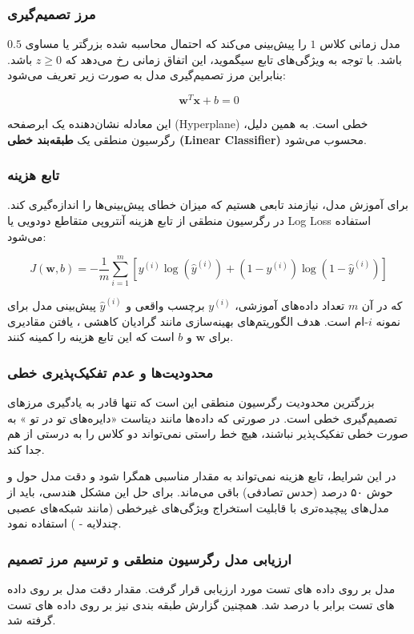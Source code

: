 \documentclass{article}
\begin{document}
\subsubsection{مرز تصمیم‌گیری }
مدل زمانی کلاس $1$ را پیش‌بینی می‌کند که احتمال محاسبه شده بزرگتر یا مساوی $0.5$ باشد. با توجه به ویژگی‌های تابع سیگموید، این اتفاق زمانی رخ می‌دهد که $z \ge 0$ باشد. بنابراین مرز تصمیم‌گیری مدل به صورت زیر تعریف می‌شود:

$$ \mathbf{w}^T \mathbf{x} + b = 0 $$

این معادله نشان‌دهنده یک ابرصفحه (Hyperplane) خطی است. به همین دلیل، رگرسیون منطقی یک \textbf{طبقه‌بند خطی (Linear Classifier)} محسوب می‌شود.

\subsubsection{تابع هزینه }
برای آموزش مدل، نیازمند تابعی هستیم که میزان خطای پیش‌بینی‌ها را اندازه‌گیری کند. در رگرسیون منطقی از تابع هزینه آنتروپی متقاطع دودویی  یا Log Loss استفاده می‌شود:

$$ J(\mathbf{w}, b) = -\frac{1}{m} \sum_{i=1}^{m} \left[ y^{(i)} \log(\hat{y}^{(i)}) + (1 - y^{(i)}) \log(1 - \hat{y}^{(i)}) \right] $$

که در آن $m$ تعداد داده‌های آموزشی، $y^{(i)}$ برچسب واقعی و $\hat{y}^{(i)}$ پیش‌بینی مدل برای نمونه $i$-ام است. هدف الگوریتم‌های بهینه‌سازی مانند گرادیان کاهشی ، یافتن مقادیری برای $\mathbf{w}$ و $b$ است که این تابع هزینه را کمینه کنند.

\subsubsection{محدودیت‌ها و عدم تفکیک‌پذیری خطی}
بزرگترین محدودیت رگرسیون منطقی این است که تنها قادر به یادگیری مرزهای تصمیم‌گیری خطی است. در صورتی که داده‌ها مانند دیتاست «دایره‌های تو در تو » به صورت خطی تفکیک‌پذیر  نباشند، هیچ خط راستی نمی‌تواند دو کلاس را به درستی از هم جدا کند. 

در این شرایط، تابع هزینه نمی‌تواند به مقدار مناسبی همگرا شود و دقت مدل حول و حوش ۵۰ درصد (حدس تصادفی) باقی می‌ماند. برای حل این مشکل هندسی، باید از مدل‌های پیچیده‌تری با قابلیت استخراج ویژگی‌های غیرخطی (مانند شبکه‌های عصبی چندلایه - ) استفاده نمود.

\subsubsection{ارزیابی مدل رگرسیون منطقی و ترسیم مرز تصمیم}
مدل بر روی داده های تست مورد ارزیابی قرار گرفت. مقدار دقت مدل بر روی داده های تست برابر با  درصد شد. همچنین گزارش طبقه بندی نیز بر روی داده های تست گرفته شد.
\end{document}
